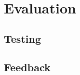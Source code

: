 \documentclass[../main.tex]{subfiles}
\begin{document}
\chapter{Evaluation}
\section{Testing}
\section{Feedback}
\end{document}
